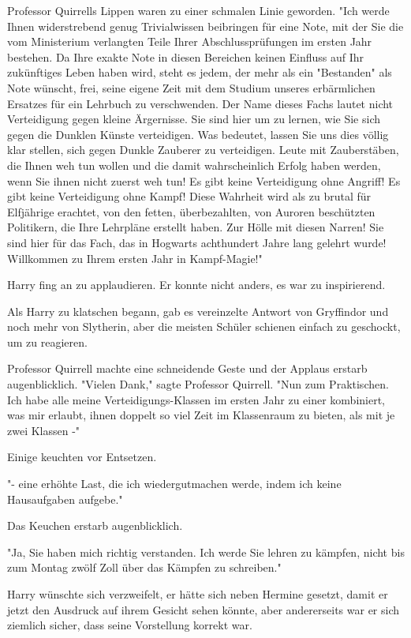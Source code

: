 {Professor Quirrells Lippen waren zu einer schmalen Linie geworden. "Ich werde Ihnen widerstrebend genug Trivialwissen beibringen für eine Note, mit der Sie die vom Ministerium verlangten Teile Ihrer Abschlussprüfungen im ersten Jahr bestehen. Da Ihre exakte Note in diesen Bereichen keinen Einfluss auf Ihr zukünftiges Leben haben wird, steht es jedem, der mehr als ein "Bestanden" als Note wünscht, frei, seine eigene Zeit mit dem Studium unseres erbärmlichen Ersatzes für ein Lehrbuch zu verschwenden. Der Name dieses Fachs lautet nicht Verteidigung gegen kleine Ärgernisse. Sie sind hier um zu lernen, wie Sie sich gegen die Dunklen Künste verteidigen. Was bedeutet, lassen Sie uns dies völlig klar stellen, sich gegen Dunkle Zauberer zu verteidigen. Leute mit Zauberstäben, die Ihnen weh tun wollen und die damit wahrscheinlich Erfolg haben werden, wenn Sie ihnen nicht zuerst weh tun! Es gibt keine Verteidigung ohne Angriff! Es gibt keine Verteidigung ohne Kampf! Diese Wahrheit wird als zu brutal für Elfjährige erachtet, von den fetten, überbezahlten, von Auroren beschützten Politikern, die Ihre Lehrpläne erstellt haben. Zur Hölle mit diesen Narren! Sie sind hier für das Fach, das in Hogwarts achthundert Jahre lang gelehrt wurde! Willkommen zu Ihrem ersten Jahr in Kampf-Magie!"

Harry fing an zu applaudieren. Er konnte nicht anders, es war zu inspirierend.

Als Harry zu klatschen begann, gab es vereinzelte Antwort von Gryffindor und noch mehr von Slytherin, aber die meisten Schüler schienen einfach zu geschockt, um zu reagieren.

Professor Quirrell machte eine schneidende Geste und der Applaus erstarb augenblicklich. "Vielen Dank," sagte Professor Quirrell. "Nun zum Praktischen. Ich habe alle meine Verteidigungs-Klassen im ersten Jahr zu einer kombiniert, was mir erlaubt, ihnen doppelt so viel Zeit im Klassenraum zu bieten, als mit je zwei Klassen -"

Einige keuchten vor Entsetzen.

"- eine erhöhte Last, die ich wiedergutmachen werde, indem ich keine Hausaufgaben aufgebe."

Das Keuchen erstarb augenblicklich.

"Ja, Sie haben mich richtig verstanden. Ich werde Sie lehren zu kämpfen, nicht bis zum Montag zwölf Zoll über das Kämpfen zu schreiben."

Harry wünschte sich verzweifelt, er hätte sich neben Hermine gesetzt, damit er jetzt den Ausdruck auf ihrem Gesicht sehen könnte, aber andererseits war er sich ziemlich sicher, dass seine Vorstellung korrekt war.

}
